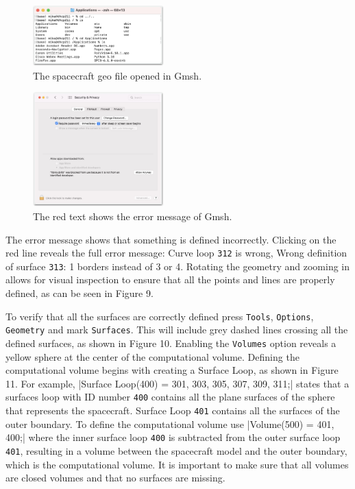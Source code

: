 \documentclass[a4paper, 11pt]{article}
\begin{document}
\begin{figure}[!ht]
    \centering
    \includegraphics[width=0.45\textwidth]{fig7.jpg}
    \caption{The spacecraft geo file opened in Gmsh.}
\end{figure}

\begin{figure}[!ht]
    \centering
    \includegraphics[width=0.45\textwidth]{fig8.jpg}
    \caption{The red text shows the error message of Gmsh.}
\end{figure}

The error message shows that something is defined incorrectly. Clicking on the red line reveals the full error message: Curve loop \verb|312| is wrong, Wrong definition of surface \verb|313|: 1 borders instead of 3 or 4. Rotating the geometry and zooming in allows for visual inspection to ensure that all the points and lines are properly defined, as can be seen in Figure 9.\par
To verify that all the surfaces are correctly defined press \verb|Tools|, \verb|Options|, \verb|Geometry| and mark \verb|Surfaces|. This will include grey dashed lines crossing all the defined surfaces, as shown in Figure 10. Enabling the \verb|Volumes| option reveals a yellow sphere at the center of the computational volume. Defining the computational volume begins with creating a Surface Loop, as shown in Figure 11. For example, |Surface Loop(400) = {301, 303, 305, 307, 309, 311};| states that a surfaces loop with ID number \verb|400| contains all the plane surfaces of the sphere that represents the spacecraft. Surface Loop \verb|401| contains all the surfaces of the outer boundary. To define the computational volume use |Volume(500) = {401, 400};| where the inner surface loop \verb|400| is subtracted from the outer surface loop \verb|401|, resulting in a volume between the spacecraft model and the outer boundary, which is the computational volume. It is important to make sure that all volumes are closed volumes and that no surfaces are missing.
\end{document}
